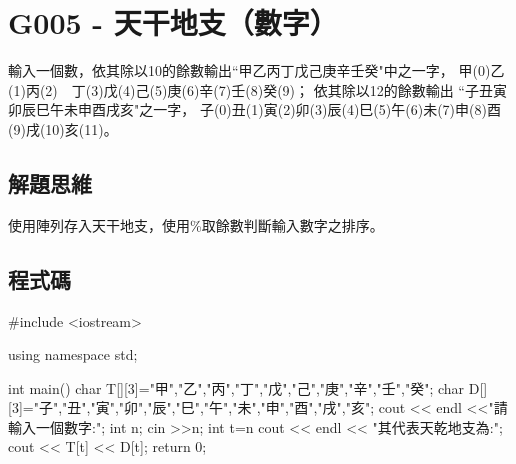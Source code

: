 \section{G005 - 天干地支（數字）}
輸入一個數，依其除以10的餘數輸出``甲乙丙丁戊己庚辛壬癸"中之一字，
甲(0)乙(1)丙(2)　丁(3)戊(4)己(5)庚(6)辛(7)壬(8)癸(9)；
依其除以12的餘數輸出
``子丑寅卯辰巳午未申酉戌亥"之一字，
子(0)丑(1)寅(2)卯(3)辰(4)巳(5)午(6)未(7)申(8)酉(9)戌(10)亥(11)。 
\subsection{解題思維}
使用陣列存入天干地支，使用\%取餘數判斷輸入數字之排序。
\subsection{程式碼}
\begin{cppcode}
#include <iostream>

using namespace std;

int main()
{	char T[][3]={"甲","乙","丙","丁","戊","己","庚","辛","壬","癸"};
	char D[][3]={"子","丑","寅","卯","辰","巳","午","未","申","酉","戌","亥"};
	cout << endl <<"請輸入一個數字:";
	int n;
	cin >>n;
	int t=n%
	cout << endl << "其代表天乾地支為:";
	cout << T[t] << D[t];
	return 0;
}
\end{cppcode}

